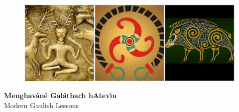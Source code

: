 \thispagestyle{empty} %

\begin{center}

\begin{figure}[H]
\centering
\includegraphics[width=16.0cm]{img/triple-image-banner.eps}
\end{figure}
\textbf{\Huge Menghav\'{a}n\'{e} Gal\'{a}thach hAtev\'{\i}u}\\
{\huge Modern Gaulish Lessons}\\

\vspace*{\fill}

\end{center}
